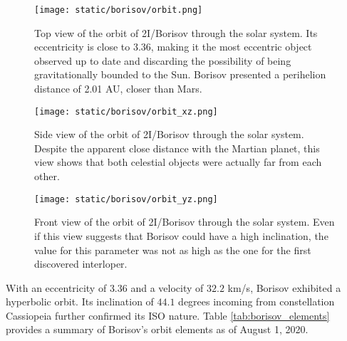 \begin{figure}[H]
  \centering
  \texttt{[image: static/borisov/orbit.png]}
  \caption[Top view of the orbit of 2I/Borisov through the solar system]{
    Top view of the orbit of 2I/Borisov through the solar system. Its eccentricity is
    close to 3.36, making it the most eccentric object observed up to date
    and discarding the possibility of being gravitationally bounded to the Sun.
    Borisov presented a perihelion distance of 2.01 AU, closer than Mars.
  }
  \label{fig:borisov_orbit}
\end{figure}


\begin{figure}[H]
  \centering
  \texttt{[image: static/borisov/orbit\_xz.png]}
  \caption[Side view of the orbit of 2I/Borisov through the solar system]{
    Side view of the orbit of 2I/Borisov through the solar system. Despite the
    apparent close distance with the Martian planet, this view shows that both
    celestial objects were actually far from each other.}
  \label{fig:borisov_orbit_xz}
\end{figure}

\begin{figure}[H]
  \centering
  \texttt{[image: static/borisov/orbit\_yz.png]}
  \caption[Front view of the orbit of 2I/Borisov through the solar system]{
    Front view of the orbit of 2I/Borisov through the solar system. Even if this
    view suggests that Borisov could have a high inclination, the value for this
    parameter was not as high as the one for the first discovered interloper.}
  \label{fig:borisov_orbit_yz}
\end{figure}

With an eccentricity of $3.36$ and a velocity of $32.2$ km/s, Borisov exhibited
a hyperbolic orbit. Its inclination of $44.1$ degrees incoming from
constellation Cassiopeia further confirmed its ISO nature. Table
\ref{tab:borisov_elements} provides a summary of Borisov's orbit elements as of
August 1, 2020.

